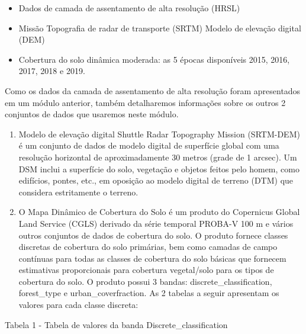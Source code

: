 \documentclass[
]{krantz}
\providecommand{\tightlist}{%
  \setlength{\itemsep}{0pt}\setlength{\parskip}{0pt}}
\begin{document}
\begin{itemize}
\tightlist
\item
  Dados de camada de assentamento de alta resolução (HRSL)
\item
  Missão Topografia de radar de transporte (SRTM) Modelo de elevação digital (DEM)
\item
  Cobertura do solo dinâmica moderada: as 5 épocas disponíveis 2015, 2016, 2017, 2018 e 2019.
\end{itemize}

Como os dados da camada de assentamento de alta resolução foram apresentados em um módulo anterior, também detalharemos informações sobre os outros 2 conjuntos de dados que usaremos neste módulo.

\begin{enumerate}
\def\labelenumi{\arabic{enumi}.}
\item
  Modelo de elevação digital Shuttle Radar Topography Mission (SRTM-DEM) é um conjunto de dados de modelo digital de superfície global com uma resolução horizontal de aproximadamente 30 metros (grade de 1 arcsec). Um DSM inclui a superfície do solo, vegetação e objetos feitos pelo homem, como edifícios, pontes, etc., em oposição ao modelo digital de terreno (DTM) que considera estritamente o terreno.
\item
  O Mapa Dinâmico de Cobertura do Solo é um produto do Copernicus Global Land Service (CGLS) derivado da série temporal PROBA-V 100 m e vários outros conjuntos de dados de cobertura do solo. O produto fornece classes discretas de cobertura do solo primárias, bem como camadas de campo contínuas para todas as classes de cobertura do solo básicas que fornecem estimativas proporcionais para cobertura vegetal/solo para os tipos de cobertura do solo. O produto possui 3 bandas: discrete\_classification, forest\_type e urban\_coverfraction. As 2 tabelas a seguir apresentam os valores para cada classe discreta:
\end{enumerate}

Tabela 1 - Tabela de valores da banda Discrete\_classification
\end{document}
